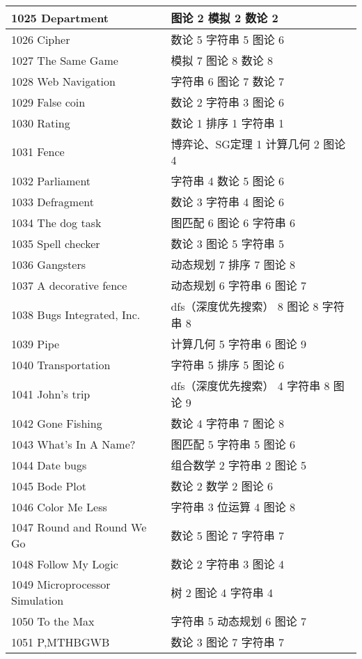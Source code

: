\begin{longtable}{| p{} | p{} |}
 1025 Department  & 图论 2 模拟 2 数论 2 \\ \hline
 1026 Cipher  & 数论 5 字符串 5 图论 6 \\ \hline
 1027 The Same Game  & 模拟 7 图论 8 数论 8 \\ \hline
 1028 Web Navigation  & 字符串 6 图论 7 数论 7 \\ \hline
 1029 False coin  & 数论 2 字符串 3 图论 6 \\ \hline
 1030 Rating  & 数论 1 排序 1 字符串 1 \\ \hline
 1031 Fence  & 博弈论、SG定理 1 计算几何 2 图论 4 \\ \hline
 1032 Parliament  & 字符串 4 数论 5 图论 6 \\ \hline
 1033 Defragment  & 数论 3 字符串 4 图论 6 \\ \hline
 1034 The dog task  & 图匹配 6 图论 6 字符串 6 \\ \hline
 1035 Spell checker  & 数论 3 图论 5 字符串 5 \\ \hline
 1036 Gangsters  & 动态规划 7 排序 7 图论 8 \\ \hline
 1037 A decorative fence  & 动态规划 6 字符串 6 图论 7 \\ \hline
 1038 Bugs Integrated, Inc.  & dfs（深度优先搜索） 8 图论 8 字符串 8 \\ \hline
 1039 Pipe  & 计算几何 5 字符串 6 图论 9 \\ \hline
 1040 Transportation  & 字符串 5 排序 5 图论 6 \\ \hline
 1041 John's trip  & dfs（深度优先搜索） 4 字符串 8 图论 9 \\ \hline
 1042 Gone Fishing  & 数论 4 字符串 7 图论 8 \\ \hline
 1043 What's In A Name?  & 图匹配 5 字符串 5 图论 6 \\ \hline
 1044 Date bugs  & 组合数学 2 字符串 2 图论 5 \\ \hline
 1045 Bode Plot  & 数论 2 数学 2 图论 6 \\ \hline
 1046 Color Me Less  & 字符串 3 位运算 4 图论 8 \\ \hline
 1047 Round and Round We Go  & 数论 5 图论 7 字符串 7 \\ \hline
 1048 Follow My Logic  & 数论 2 字符串 3 图论 4 \\ \hline
 1049 Microprocessor Simulation  & 树 2 图论 4 字符串 4 \\ \hline
 1050 To the Max  & 字符串 5 动态规划 6 图论 7 \\ \hline
 1051 P,MTHBGWB  & 数论 3 图论 7 字符串 7 \\ \hline

\end{longtable}
